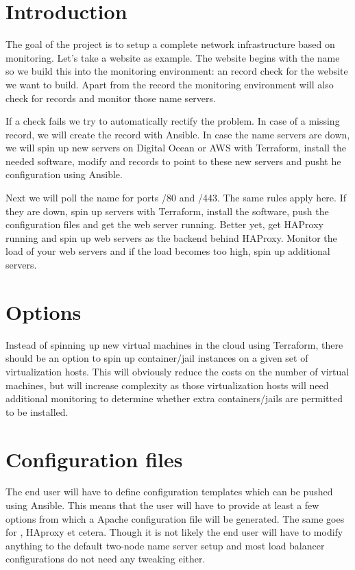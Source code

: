 \documentclass[a4paper,12pt]{scrartcl}
\begin{document}
\maketitle



\section{Introduction}
The goal of the  project is to setup a complete network infrastructure based on monitoring.
Let's take a website as example.
The website begins with the  name so we build this into the monitoring environment: an  record check for the website we want to build.
Apart from the  record the monitoring environment will also check for  records and monitor those name servers.

If a check fails we try to automatically rectify the problem.
In case of a missing  record, we will create the record with Ansible.
In case the name servers are down, we will spin up new servers on Digital Ocean or AWS with Terraform, install the needed software, modify  and  records to point to these new servers and pusht he  configuration using Ansible.

Next we will poll the  name for ports /80 and /443.
The same rules apply here.
If they are down, spin up servers with Terraform, install the software, push the configuration files and get the web server running.
Better yet, get HAProxy running and spin up web servers as the backend behind HAProxy.
Monitor the load of your web servers and if the load becomes too high, spin up additional servers.



\section{Options}
Instead of spinning up new virtual machines in the cloud using Terraform, there should be an option to spin up container/jail instances on a given set of virtualization hosts.
This will obviously reduce the costs on the number of virtual machines, but will increase complexity as those virtualization hosts will need additional monitoring to determine whether extra containers/jails are permitted to be installed.



\section{Configuration files}
The end user will have to define configuration templates which can be pushed using Ansible.
This means that the user will have to provide at least a few options from which a Apache configuration file will be generated.
The same goes for , HAproxy et cetera.
Though it is not likely the end user will have to modify anything to the default two-node name server setup and most load balancer configurations do not need any tweaking either.
\end{document}
